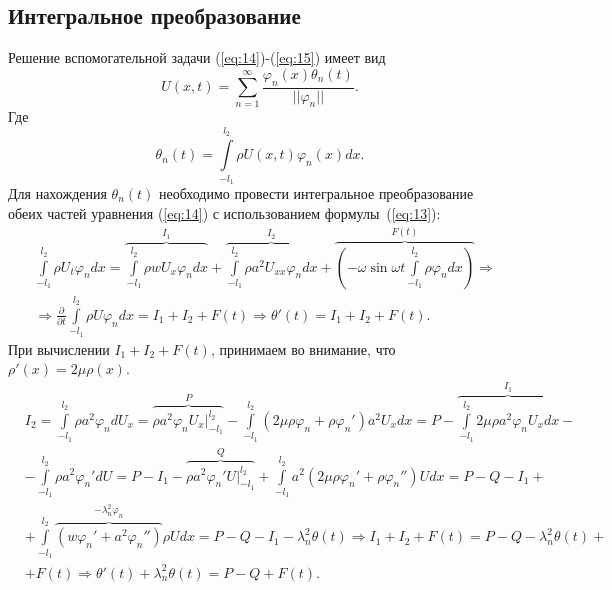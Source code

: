 \documentclass[12pt, a4paper]{article}
\begin{document}
\subsection{Интегральное преобразование}
Решение вспомогательной задачи (\ref{eq:14})-(\ref{eq:15}) имеет вид 
\begin{equation}
  U(x,t)=\sum \limits_{n=1}^{\infty} \frac{\varphi_n(x) \theta_n(t)}{||\varphi_n||}.
\end{equation}
Где
\begin{equation}
  \theta_n(t) = \int \limits_{-l_1}^{l_2} \rho U(x,t) \varphi_n(x) dx.
  \label{eq:13}
\end{equation}
Для нахождения $\theta_n(t)$ необходимо провести интегральное преобразование обеих частей уравнения (\ref{eq:14}) с использованием формулы~(\ref{eq:13}):
\begin{equation}
  \begin{aligned}
    & \int \limits_{-l_1}^{l_2} \rho U_t \varphi_n dx = \overbrace{\int \limits_{-l_1}^{l_2} \rho w U_x \varphi_n dx}^{I_1} + \overbrace{\int \limits_{-l_1}^{l_2} \rho a^2 U_{xx} \varphi_n dx}^{I_2} +  \overbrace{\left( -\omega \sin \omega t \int \limits_{-l_1}^{l_2} \rho \varphi_n dx \right)}^{F(t)}  \Rightarrow \\
  & \Rightarrow \frac{\partial}{\partial t} \int \limits_{-l_1}^{l_2} \rho U \varphi_n dx = I_1 + I_2 + F(t) \Rightarrow \theta'(t) = I_1 + I_2 + F(t).
\end{aligned}
\end{equation}
При вычислении $I_1+I_2+F(t)$, принимаем во внимание, что $\rho'(x) = 2 \mu \rho(x)$.
\begin{equation}
  \begin{aligned}
    & I_2 = \int \limits_{-l_1}^{l_2} \rho a^2 \varphi_n d U_x = \overbrace{\rho a^2 \varphi_n U_x \Big|^{l_2}_{-l_1}}^P - 
    \int \limits_{-l_1}^{l_2} (2\mu\rho\varphi_n + \rho\varphi_n') a^2 U_x dx = P - \overbrace{\int \limits_{-l_1}^{l_2} 2 \mu \rho a^2 \varphi_n U_x dx}^{I_1} - \\
    & - \int \limits_{-l_1}^{l_2} \rho a^2\varphi_n'd U = P - I_1 - \overbrace{\rho a^2 \varphi_n' U \Big|^{l_2}_{-l_1}}^Q + 
    \int \limits_{-l_1}^{l_2} a^2 (2\mu\rho\varphi_n' + \rho\varphi_n'') U dx = P - Q - I_1 + \\
    & + \int \limits_{-l_1}^{l_2} \overbrace{(w\varphi_n' + a^2\varphi_n'')}^{-\lambda_n^2\varphi_n} \rho U dx = P - Q - I_1 - \lambda_n^2 \theta(t) \Rightarrow I_1 + I_2 + F(t) = P - Q - 
    \lambda_n^2 \theta(t) + \\
    & + F(t) \Rightarrow \theta'(t) + \lambda_n^2 \theta(t) = P - Q + F(t).
  \end{aligned}
  \label{eq:17}
\end{equation}
\end{document}
